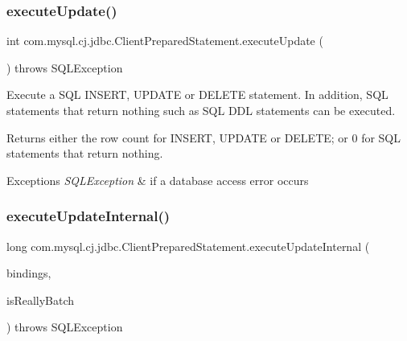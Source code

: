 \subsubsection{\texorpdfstring{execute\+Update()}{executeUpdate()}}
{\footnotesize\ttfamily int com.\+mysql.\+cj.\+jdbc.\+Client\+Prepared\+Statement.\+execute\+Update (\begin{DoxyParamCaption}{ }\end{DoxyParamCaption}) throws S\+Q\+L\+Exception}

Execute a S\+QL I\+N\+S\+E\+RT, U\+P\+D\+A\+TE or D\+E\+L\+E\+TE statement. In addition, S\+QL statements that return nothing such as S\+QL D\+DL statements can be executed.

\begin{DoxyReturn}{Returns}
either the row count for I\+N\+S\+E\+RT, U\+P\+D\+A\+TE or D\+E\+L\+E\+TE; or 0 for S\+QL statements that return nothing.
\end{DoxyReturn}

\begin{DoxyExceptions}{Exceptions}
{\em S\+Q\+L\+Exception} & if a database access error occurs \\
\hline
\end{DoxyExceptions}
\mbox{\label{classcom_1_1mysql_1_1cj_1_1jdbc_1_1_client_prepared_statement_ababbfe9c3963f27842243160c2464af1}} 
\subsubsection{\texorpdfstring{execute\+Update\+Internal()}{executeUpdateInternal()}}
{\footnotesize\ttfamily long com.\+mysql.\+cj.\+jdbc.\+Client\+Prepared\+Statement.\+execute\+Update\+Internal (\begin{DoxyParamCaption}\item[{\mbox{\hyperlink{interfacecom_1_1mysql_1_1cj_1_1_query_bindings}{Query\+Bindings}}$<$?$>$}]{bindings,  }\item[{boolean}]{is\+Really\+Batch }\end{DoxyParamCaption}) throws S\+Q\+L\+Exception\hspace{0.3cm}{\ttfamily [protected]}}

